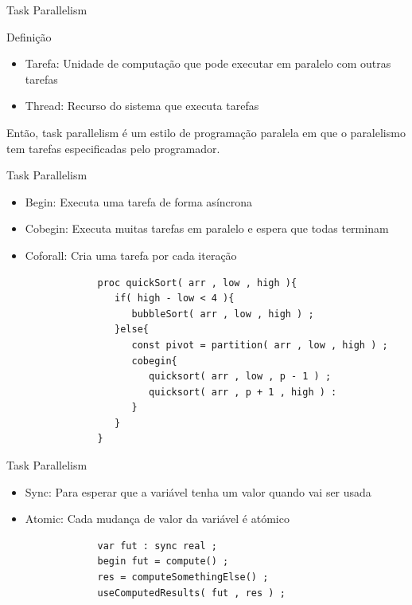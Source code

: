 		\begin{frame}[fragile]{Task Parallelism}
			\begin{block}{Definição}
				\begin{itemize}
					\item Tarefa: Unidade de computação que pode executar em paralelo com outras tarefas
					\item Thread: Recurso do sistema que executa tarefas
				\end{itemize}
				Então, task parallelism é um estilo de programação paralela em que o paralelismo tem tarefas especificadas pelo programador.
			\end{block}
		\end{frame}
		\begin{frame}[fragile]{Task Parallelism}
			\begin{block}{}
				\begin{itemize}
					\item Begin: Executa uma tarefa de forma asíncrona
					\item Cobegin: Executa muitas tarefas em paralelo e espera que todas terminam
					\item Coforall: Cria uma tarefa por cada iteração
				\end{itemize}
			\end{block}
			\begin{lstlisting}
				proc quickSort( arr , low , high ){
				   if( high - low < 4 ){
				      bubbleSort( arr , low , high ) ;
				   }else{
				      const pivot = partition( arr , low , high ) ;
				      cobegin{
				         quicksort( arr , low , p - 1 ) ;
				         quicksort( arr , p + 1 , high ) :
				      }
				   }
				}
			\end{lstlisting}
		\end{frame}
		\begin{frame}[fragile]{Task Parallelism}
			\begin{block}{}
				\begin{itemize}
					\item Sync: Para esperar que a variável tenha um valor quando vai ser usada
					\item Atomic: Cada mudança de valor da variável é atómico
				\end{itemize}
			\end{block}
			\begin{lstlisting}
				var fut : sync real ;
				begin fut = compute() ;
				res = computeSomethingElse() ;
				useComputedResults( fut , res ) ;
			\end{lstlisting}
		\end{frame}
		
